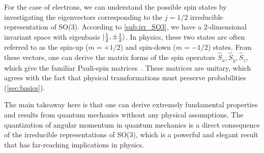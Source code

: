 For the case of electrons, we can understand the possible spin states by investigating the eigenvectors corresponding to the $j=1/2$ irreducible representation of SO(3). According to \cref{sub:irr_SO3}, we have a 2-dimensional invariant space with eigenbasis $\ket{\frac{1}{2},\pm \frac{1}{2}}$. In physics, these two states are often referred to as the spin-up ($m=+1/2$) and spin-down ($m=-1/2$) states. From these vectors, one can derive the matrix forms of the spin operators $\hat{S}_x,\hat{S}_y,\hat{S}_z$, which give the familiar Pauli-spin matrices~\cite{Griffiths2018}. These matrices are unitary, which agrees with the fact that physical transformations must preserve probabilities (\cref{sec:basics}).

The main takeaway here is that one can derive extremely fundamental properties and results from quantum mechanics without any physical assumptions. The quantization of angular momentum in quantum mechanics is a direct consequence of the irreducible representations of SO(3), which is a powerful and elegant result that has far-reaching implications in physics.



